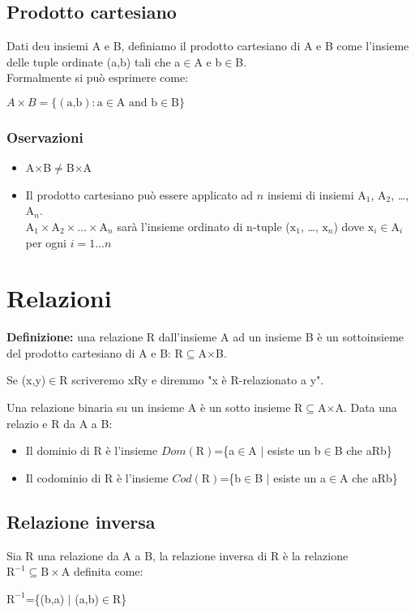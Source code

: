 \documentclass[../main.tex]{subfiles}
\newcommand{\spazio}{\vspace{1em} \newline}
\begin{document}
    \subsection{Prodotto cartesiano}
    Dati deu insiemi A e B, definiamo il prodotto cartesiano di A e B come l'insieme delle tuple ordinate (a,b) tali che a$\in$A e b$\in$B.\\
    Formalmente si può esprimere come:
    \begin{center}
        $A \times B=\{(\text{a,b}) : \text{a} \in \text{A and b} \in \text{B}\}$
    \end{center}

    \subsubsection{Oservazioni}
    \begin{itemize}
        \item A$\times$B$\neq$B$\times$A
        \item Il prodotto cartesiano può essere applicato ad $n$ insiemi di insiemi $\text{A}_1$, $\text{A}_2$, \dots , $\text{A}_n$.\\
        $\text{A}_1 \times \text{A}_2 \times \dots \times \text{A}_n$ sarà l'insieme ordinato di n-tuple ($\text{x}_1$, \dots , $\text{x}_n$) dove $\text{x}_i \in \text{A}_i$ per ogni $i=1 \dots n$
    \end{itemize}

    \section{Relazioni}
    \textbf{Definizione:} una relazione R dall'insieme A ad un insieme B è un sottoinsieme del prodotto cartesiano di A e B: R$\subseteq$A$\times$B.


    Se (x,y)$\in$R scriveremo xRy e diremmo "x è R-relazionato a y".


    Una relazione binaria su un insieme A è un sotto insieme R$\subseteq$A$\times$A.
    \spazio
    Data una relazio e R da A a B:
    \begin{itemize}
        \item Il dominio di R è l'insieme $Dom(\text{R})$=\{a$\in$A $|$ esiste un b$\in$B che aRb\}
        \item Il codominio di R è l'insieme $Cod(\text{R})$=\{b$\in$B $|$ esiste un a$\in$A che aRb\}
    \end{itemize}

    \subsection{Relazione inversa}
    Sia R una relazione da A a B, la relazione inversa di R è la relazione $\text{R}^{-1} \subseteq \text{B} \times \text{A}$ definita come:
    \begin{center}
        $\text{R}^{-1}$=\{(b,a) $|$ (a,b)$\in$R\}
    \end{center}
\end{document}
